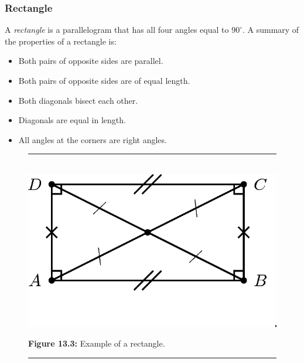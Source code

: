             \subsubsection{ Rectangle}
            \nopagebreak
          \label{m39354*id318929}A \textsl{rectangle} is a parallelogram that has all four angles equal to ${90}^{\circ }$. A summary of the properties of a rectangle is:\par 
          \label{m39354*id318954}\begin{itemize}[noitemsep]
            \label{m39354*uid63}\item Both pairs of opposite sides are parallel.
\label{m39354*uid64}\item Both pairs of opposite sides are of equal length.
\label{m39354*uid65}\item Both diagonals bisect each other.
\label{m39354*uid66}\item Diagonals are equal in length.
\label{m39354*uid67}\item All angles at the corners are right angles.
\end{itemize}
    \setcounter{subfigure}{0}
	\begin{figure}[H] %
    \begin{center}
    \rule[.1in]{\figurerulewidth}{.005in} \\
        \label{m39354*uid68!!!underscore!!!media}\label{m39354*uid68!!!underscore!!!printimage}\includegraphics{col11306.imgs/m39354_MG10C13_042.png} %
      \vspace{2pt}
    \vspace{\rubberspace}\par \begin{cnxcaption}
	  \small \textbf{Figure 13.3: }Example of a rectangle.
	\end{cnxcaption}
    \vspace{.1in}
    \rule[.1in]{\figurerulewidth}{.005in} \\
    \end{center}
 \end{figure}       
        \label{m39354*uid69}
